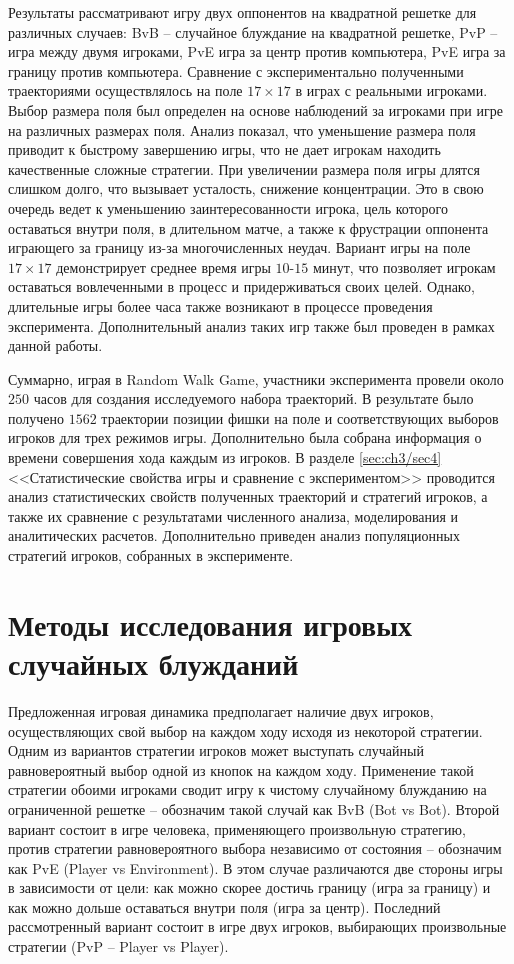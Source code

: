 Результаты рассматривают игру двух оппонентов на квадратной решетке для различных случаев: BvB -- случайное блуждание на квадратной решетке, PvP -- игра между двумя игроками, PvE игра за центр против компьютера, PvE игра за границу против компьютера. Сравнение с экспериментально полученными траекториями осуществлялось на поле $17 \times 17$ в играх с реальными игроками. Выбор размера поля был определен на основе наблюдений за игроками при игре на различных размерах поля. Анализ показал, что уменьшение размера поля приводит к быстрому завершению игры, что не дает игрокам находить качественные сложные стратегии. При увеличении размера поля игры длятся слишком долго, что вызывает усталость, снижение концентрации. Это в свою очередь ведет к уменьшению заинтересованности игрока, цель которого оставаться внутри поля, в длительном матче, а также к фрустрации оппонента играющего за границу из-за многочисленных неудач. Вариант игры на поле $17 \times 17$ демонстрирует среднее время игры $10$-$15$ минут, что позволяет игрокам оставаться вовлеченными в процесс и придерживаться своих целей. Однако, длительные игры более часа также возникают в процессе проведения эксперимента. Дополнительный анализ таких игр также был проведен в рамках данной работы.

Суммарно, играя в Random Walk Game, участники эксперимента провели около $250$ часов для создания исследуемого набора траекторий. В результате было получено $1562$ траектории позиции фишки на поле и соответствующих выборов игроков для трех режимов игры. Дополнительно была собрана информация о времени совершения хода каждым из игроков. В разделе \cref{sec:ch3/sec4} <<Статистические свойства игры и сравнение с экспериментом>> проводится анализ статистических свойств полученных траекторий и стратегий игроков, а также их сравнение с результатами численного анализа, моделирования и аналитических расчетов. Дополнительно приведен анализ популяционных стратегий игроков, собранных в эксперименте.

\section{Методы исследования игровых случайных блужданий}\label{sec:ch3/sec2}

Предложенная игровая динамика предполагает наличие двух игроков, осуществляющих свой выбор на каждом ходу исходя из некоторой стратегии. Одним из вариантов стратегии игроков может выступать случайный равновероятный выбор одной из кнопок на каждом ходу. Применение такой стратегии обоими игроками сводит игру к чистому случайному блужданию на ограниченной решетке -- обозначим такой случай как BvB (Bot vs Bot). Второй вариант состоит в игре человека, применяющего произвольную стратегию, против стратегии равновероятного выбора независимо от состояния -- обозначим как PvE (Player vs Environment). В этом случае различаются две стороны игры в зависимости от цели: как можно скорее достичь границу (игра за границу) и как можно дольше оставаться внутри поля (игра за центр). Последний рассмотренный вариант состоит в игре двух игроков, выбирающих произвольные стратегии (PvP -- Player vs Player).

